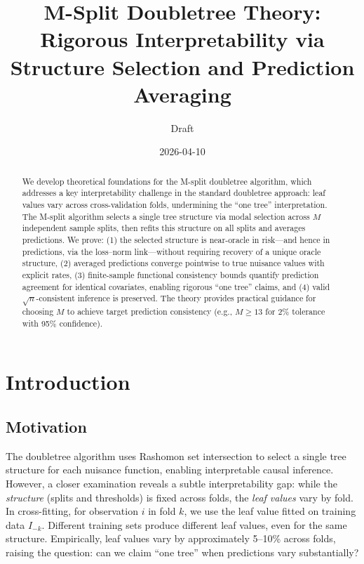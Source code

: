 \documentclass[12pt]{article}
\title{M-Split Doubletree Theory:\\
Rigorous Interpretability via Structure Selection and Prediction Averaging}
\author{Draft}
\date{2026-04-10}
\begin{document}
\maketitle

\begin{abstract}
We develop theoretical foundations for the M-split doubletree algorithm, which addresses a key interpretability challenge in the standard doubletree approach: leaf values vary across cross-validation folds, undermining the ``one tree'' interpretation. The M-split algorithm selects a single tree structure via modal selection across $M$ independent sample splits, then refits this structure on all splits and averages predictions. We prove: (1) the selected structure is near-oracle in risk---and hence in predictions, via the loss--norm link---without requiring recovery of a unique oracle structure, (2) averaged predictions converge pointwise to true nuisance values with explicit rates, (3) finite-sample functional consistency bounds quantify prediction agreement for identical covariates, enabling rigorous ``one tree'' claims, and (4) valid $\sqrt{n}$-consistent inference is preserved. The theory provides practical guidance for choosing $M$ to achieve target prediction consistency (e.g., $M \ge 13$ for 2\% tolerance with 95\% confidence).
\end{abstract}

\tableofcontents

\section{Introduction}

\subsection{Motivation}

The doubletree algorithm \citep{manuscript} uses Rashomon set intersection to select a single tree structure for each nuisance function, enabling interpretable causal inference. However, a closer examination reveals a subtle interpretability gap: while the \emph{structure} (splits and thresholds) is fixed across folds, the \emph{leaf values} vary by fold. In cross-fitting, for observation $i$ in fold $k$, we use the leaf value fitted on training data $I_{-k}$. Different training sets produce different leaf values, even for the same structure. Empirically, leaf values vary by approximately 5--10\% across folds, raising the question: can we claim ``one tree'' when predictions vary substantially?
\end{document}
